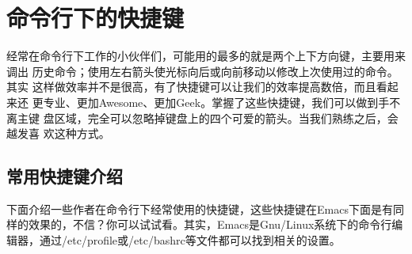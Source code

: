 \section{命令行下的快捷键}
\label{shortcut}

经常在命令行下工作的小伙伴们，可能用的最多的就是两个上下方向键，主要用来调出
历史命令；使用左右箭头使光标向后或向前移动以修改上次使用过的命令。其实
这样做效率并不是很高，有了快捷键可以让我们的效率提高数倍，而且看起来还
更专业、更加Awesome、更加Geek。掌握了这些快捷键，我们可以做到手不离主键
盘区域，完全可以忽略掉键盘上的四个可爱的箭头。当我们熟练之后，会越发喜
欢这种方式。

\subsection{常用快捷键介绍}

下面介绍一些作者在命令行下经常使用的快捷键，这些快捷键在Emacs下面是有同
样的效果的，不信？你可以试试看。其实，Emacs是Gnu/Linux系统下的命令行编
辑器，通过/etc/profile或/etc/bashrc等文件都可以找到相关的设置。


